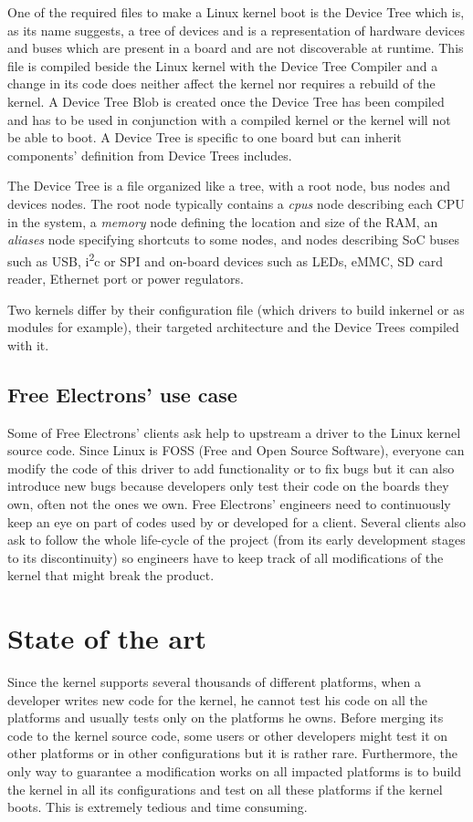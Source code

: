 One of the required files to make a Linux kernel boot is the Device Tree which is, as its name suggests, a tree of devices and is a representation of hardware devices and buses which are present in a board and are not discoverable at runtime. This file is compiled beside the Linux kernel with the Device Tree Compiler and a change in its code does neither affect the kernel nor requires a rebuild of the kernel. A Device Tree Blob is created once the Device Tree has been compiled and has to be used in conjunction with a compiled kernel or the kernel will not be able to boot. A Device Tree is specific to one board but can inherit components' definition from Device Trees includes.

The Device Tree is a file organized like a tree, with a root node, bus nodes and devices nodes. The root node typically contains a \textit{cpus} node describing each CPU in the system, a \textit{memory} node defining the location and size of the RAM, an \textit{aliases} node specifying shortcuts to some nodes, and nodes describing SoC buses such as USB, i\textsuperscript{2}c or SPI and on-board devices such as LEDs, eMMC, SD card reader, Ethernet port or power regulators.

Two kernels differ by their configuration file (which drivers to build inkernel or as modules for example), their targeted architecture and the Device Trees compiled with it.

\subsection{Free Electrons' use case}
Some of Free Electrons' clients ask help to upstream a driver to the Linux kernel source code. Since Linux is FOSS (Free and Open Source Software), everyone can modify the code of this driver to add functionality or to fix bugs but it can also introduce new bugs because developers only test their code on the boards they own, often not the ones we own. Free Electrons' engineers need to continuously keep an eye on part of codes used by or developed for a client. Several clients also ask to follow the whole life-cycle of the project (from its early development stages to its discontinuity) so engineers have to keep track of all modifications of the kernel that might break the product.

\section{State of the art}
Since the kernel supports several thousands of different platforms, when a developer writes new code for the kernel, he cannot test his code on all the platforms and usually tests only on the platforms he owns. Before merging its code to the kernel source code, some users or other developers might test it on other platforms or in other configurations but it is rather rare. Furthermore, the only way to guarantee a modification works on all impacted platforms is to build the kernel in all its configurations and test on all these platforms if the kernel boots. This is extremely tedious and time consuming.

